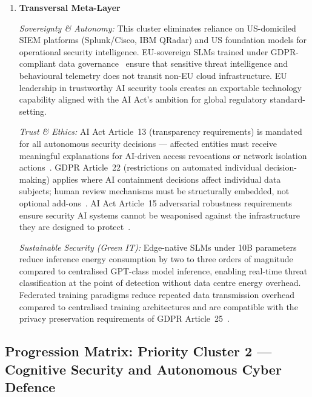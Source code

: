 \begin{enumerate}
\item \textbf{Transversal Meta-Layer}

\textit{Sovereignty \& Autonomy:}
This cluster eliminates reliance on US-domiciled SIEM platforms (Splunk/Cisco, IBM QRadar)
and US foundation models for operational security intelligence. EU-sovereign SLMs trained
under GDPR-compliant data governance~\cite{gdpr} ensure that sensitive threat intelligence
and behavioural telemetry does not transit non-EU cloud infrastructure. EU leadership in
trustworthy AI security tools creates an exportable technology capability aligned with
the AI Act's ambition for global regulatory standard-setting.

\textit{Trust \& Ethics:}
AI Act Article~13 (transparency requirements) is mandated for all autonomous security
decisions --- affected entities must receive meaningful explanations for AI-driven access
revocations or network isolation actions~\cite{aiact}. GDPR Article~22 (restrictions on
automated individual decision-making) applies where AI containment decisions affect
individual data subjects; human review mechanisms must be structurally embedded, not
optional add-ons~\cite{gdpr}. AI Act Article~15 adversarial robustness requirements
ensure security AI systems cannot be weaponised against the infrastructure they are
designed to protect~\cite{aiact}.

\textit{Sustainable Security (Green IT):}
Edge-native SLMs under 10B parameters reduce inference energy consumption by two to
three orders of magnitude compared to centralised GPT-class model inference, enabling
real-time threat classification at the point of detection without data centre energy
overhead. Federated training paradigms reduce repeated data transmission overhead
compared to centralised training architectures and are compatible with the privacy
preservation requirements of GDPR Article~25~\cite{gdpr}.

\end{enumerate}

\newpage
\subsection{Progression Matrix: Priority Cluster 2 --- Cognitive Security and Autonomous
Cyber Defence}

